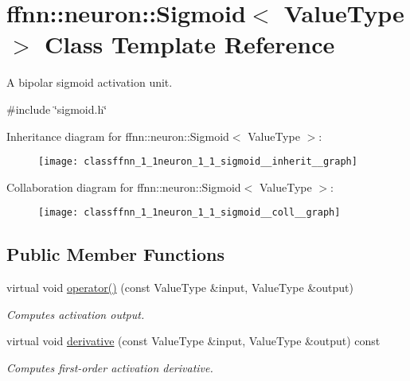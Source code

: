\hypertarget{classffnn_1_1neuron_1_1_sigmoid}{\section{ffnn\-:\-:neuron\-:\-:Sigmoid$<$ Value\-Type $>$ Class Template Reference}
\label{classffnn_1_1neuron_1_1_sigmoid}
}


A bipolar sigmoid activation unit.  




{\ttfamily \#include \char`\"{}sigmoid.\-h\char`\"{}}



Inheritance diagram for ffnn\-:\-:neuron\-:\-:Sigmoid$<$ Value\-Type $>$\-:\nopagebreak
\begin{figure}[H]
\begin{center}
\leavevmode
\texttt{[image: classffnn\_1\_1neuron\_1\_1\_sigmoid\_\_inherit\_\_graph]}
\end{center}
\end{figure}


Collaboration diagram for ffnn\-:\-:neuron\-:\-:Sigmoid$<$ Value\-Type $>$\-:\nopagebreak
\begin{figure}[H]
\begin{center}
\leavevmode
\texttt{[image: classffnn\_1\_1neuron\_1\_1\_sigmoid\_\_coll\_\_graph]}
\end{center}
\end{figure}
\subsection*{Public Member Functions}
\begin{DoxyCompactItemize}
\item 
virtual void \hyperlink{classffnn_1_1neuron_1_1_sigmoid_a1176976ca74341daac6c1720f7056d39}{operator()} (const Value\-Type \&input, Value\-Type \&output)
\begin{DoxyCompactList}\small\item\em Computes activation output. \end{DoxyCompactList}\item 
virtual void \hyperlink{classffnn_1_1neuron_1_1_sigmoid_aee2a196924df30414539d75caa6c7030}{derivative} (const Value\-Type \&input, Value\-Type \&output) const 
\begin{DoxyCompactList}\small\item\em Computes first-\/order activation derivative. \end{DoxyCompactList}\end{DoxyCompactItemize}


